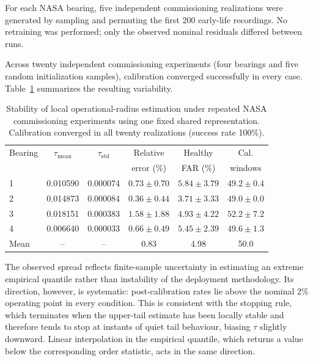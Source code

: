 \documentclass{trbunofficial}
\begin{document}
For each NASA bearing, five independent commissioning realizations were generated by sampling and permuting the first 200 early-life recordings.
No retraining was performed; only the observed nominal residuals differed between runs.

Across twenty independent commissioning experiments (four bearings and five
random initialization samples), calibration converged successfully in every
case. Table~\ref{tab:nasa-stability} summarizes the resulting variability.

\begin{table}[!ht]
\centering
\caption{Stability of local operational-radius estimation under repeated
NASA commissioning experiments using one fixed shared representation.
Calibration converged in all twenty realizations (success rate 100\%).}
\label{tab:nasa-stability}
\footnotesize
\setlength{\tabcolsep}{4pt}
\begin{tabular}{@{}lccccc@{}}
\toprule
Bearing & $\tau_{\mathrm{mean}}$ & $\tau_{\mathrm{std}}$ & Relative   & Healthy   & Cal.    \\
        &                        &                       & error (\%) & FAR (\%)  & windows \\
\midrule
1 & 0.010590 & 0.000074 & $0.73 \pm 0.70$ & $5.84 \pm 3.79$ & $49.2 \pm 0.4$ \\
2 & 0.014873 & 0.000084 & $0.36 \pm 0.44$ & $3.71 \pm 3.33$ & $49.0 \pm 0.0$ \\
3 & 0.018151 & 0.000383 & $1.58 \pm 1.88$ & $4.93 \pm 4.22$ & $52.2 \pm 7.2$ \\
4 & 0.006640 & 0.000033 & $0.66 \pm 0.49$ & $5.45 \pm 2.39$ & $49.6 \pm 1.3$ \\
\midrule
Mean & -- & -- & 0.83 & 4.98 & 50.0 \\
\bottomrule
\end{tabular}
\end{table}


The observed spread reflects finite-sample uncertainty in estimating an extreme
empirical quantile rather than instability of the deployment methodology. Its
direction, however, is systematic: post-calibration rates lie above the nominal
2\% operating point in every condition. This is consistent with the stopping
rule, which terminates when the upper-tail estimate has been locally stable and
therefore tends to stop at instants of quiet tail behaviour, biasing $\tau$
slightly downward. Linear interpolation in the empirical quantile, which
returns a value below the corresponding order statistic, acts in the same
direction.
\end{document}
